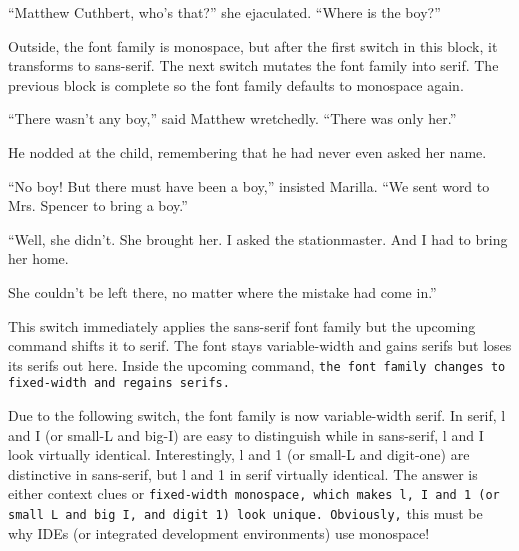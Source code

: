 \documentclass[a4paper]{article}
\begin{document}
``Matthew Cuthbert, who's that?'' she ejaculated. ``Where is the boy?''


{Outside, the font family is monospace, \sffamily but after the first switch in this block, it transforms to sans-serif. \rmfamily The next switch mutates the font family into serif.} The previous block is complete so the font family defaults to monospace again.

{``There wasn't any boy,'' said Matthew wretchedly. \rmfamily``There was only her.''

He nodded at the child, remembering that he had never even asked her name.

``No boy! \sffamily But there must have been a boy,'' insisted Marilla. ``We sent word to Mrs. Spencer to bring a boy.''

``Well, she didn't. She brought her. I asked the stationmaster. And I had to bring her home.} She couldn't be left there, no matter where the mistake had come in.''

\sffamily This switch immediately applies the sans-serif font family but the upcoming command \textrm{shifts it to serif. The font stays variable-width and gains serifs} but loses its serifs out here. Inside the upcoming command, \texttt{the font family changes to fixed-width and regains serifs.}

Due to the following switch, \rmfamily the font family is now variable-width serif. In serif, l and I (or small-L and big-I) are easy to distinguish while \textsf{in sans-serif, l and I look virtually identical. Interestingly, l and 1 (or small-L and digit-one) are distinctive in sans-serif,} but l and 1 in serif virtually identical. The answer is either context clues or \texttt{fixed-width monospace, which makes l, I and 1 (or small L and big I, and digit 1) look unique. Obviously,} this must be why IDEs (or integrated development environments) use monospace!
\end{document}
